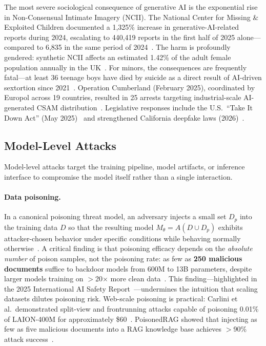 The most severe sociological consequence of generative AI is the exponential rise in Non-Consensual Intimate Imagery (NCII). The National Center for Missing \& Exploited Children documented a 1,325\% increase in generative-AI-related reports during 2024, escalating to 440,419 reports in the first half of 2025 alone---compared to 6,835 in the same period of 2024~\cite{ncmec2025}. The harm is profoundly gendered: synthetic NCII affects an estimated 1.42\% of the adult female population annually in the UK~\cite{swgfl2025}. For minors, the consequences are frequently fatal---at least 36 teenage boys have died by suicide as a direct result of AI-driven sextortion since 2021~\cite{ncmec2025}. Operation Cumberland (February 2025), coordinated by Europol across 19 countries, resulted in 25 arrests targeting industrial-scale AI-generated CSAM distribution~\cite{europol2025cumberland}. Legislative responses include the U.S.\ ``Take It Down Act'' (May 2025)~\cite{takeitdown2025} and strengthened California deepfake laws (2026)~\cite{calmatters2026deepfake}.


\subsection{Model-Level Attacks}
\label{sec:threat-model}

Model-level attacks target the training pipeline, model artifacts, or inference interface to compromise the model itself rather than a single interaction.

\paragraph{Data poisoning.}
In a canonical poisoning threat model, an adversary injects a small set $D_p$ into the training data $D$ so that the resulting model $M_\theta = A(D \cup D_p)$ exhibits attacker-chosen behavior under specific conditions while behaving normally otherwise~\cite{carlini2024poisoning}. A critical finding is that poisoning efficacy depends on the \emph{absolute number} of poison samples, not the poisoning rate: as few as \textbf{250 malicious documents} suffice to backdoor models from 600M to 13B parameters, despite larger models training on $>$20$\times$ more clean data~\cite{souly2025poisoning}. This finding---highlighted in the 2025 International AI Safety Report~\cite{aisafetyreport2025}---undermines the intuition that scaling datasets dilutes poisoning risk. Web-scale poisoning is practical: Carlini et al.\ demonstrated split-view and frontrunning attacks capable of poisoning 0.01\% of LAION-400M for approximately \$60~\cite{carlini2024poisoning}. PoisonedRAG showed that injecting as few as five malicious documents into a RAG knowledge base achieves $>$90\% attack success~\cite{zou2025poisonedrag}.

